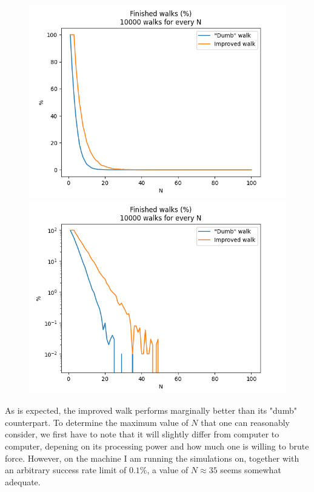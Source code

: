 \documentclass[a4paper,12pt]{article}
\begin{document}
\begin{figure}[!ht]
  \centering
  \begin{minipage}{0.48\textwidth}
    \includegraphics[width=\textwidth]{img/2_1d_percent_completed_comparison_10000.png}
  \end{minipage}
  \begin{minipage}{0.48\textwidth}
    \includegraphics[width=\textwidth]{img/2_1d_percent_completed_comparison_log_10000.png}
  \end{minipage}
\end{figure}

As is expected, the improved walk performs marginally better than its "dumb" counterpart. To determine the maximum
value of $N$ that one can reasonably consider, we first have to note that it will slightly differ from computer to
computer, depening on its processing power and how much one is willing to brute force. However, on the machine I am
running the simulations on, together with an arbitrary success rate limit of $0.1\%$, a value of $N \approx 35$ seems
somewhat adequate.
\end{document}
